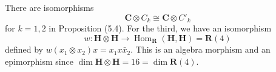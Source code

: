There are isomorphisms
$$
\mathbf{C} \otimes C_k \cong \mathbf{C} \otimes C'_k
$$
for $k = 1, 2$ in Proposition (5.4). For the third, we have an isomorphism
$$
w: \mathbf{H} \otimes \mathbf{H} \to \operatorname{Hom}_{\mathbf{R}}(\mathbf{H}, \mathbf{H}) = \mathbf{R}(4)
$$
defined by $w(x_1 \otimes x_2)x = x_1 x \bar{x}_2$. This is an algebra morphism and an epimorphism since $\dim \mathbf{H} \otimes \mathbf{H} = 16 = \dim \mathbf{R}(4)$.
